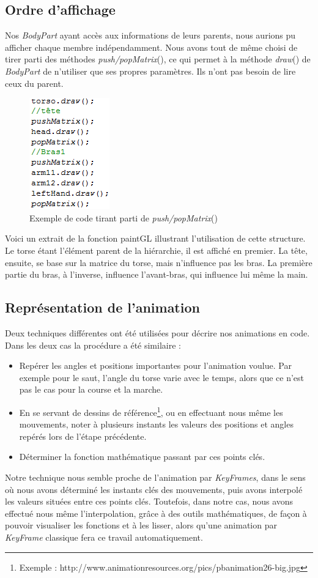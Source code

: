 \documentclass[10pt,a4paper,titlepage]{article}
\begin{document}
\subsection{Ordre d'affichage}
Nos \textit{BodyPart} ayant accès aux informations de leurs parents, nous aurions pu afficher chaque membre indépendamment. Nous avons tout de même choisi de tirer parti des méthodes \textit{push/popMatrix}(), ce qui permet à la méthode \textit{draw}() de \textit{BodyPart} de n'utiliser que ses propres paramètres. Ils n'ont pas besoin de lire ceux du parent.
\par
\begin{figure}[htbp]
\centering
\includegraphics{exemple_code_matrix.png}
\caption{Exemple de code tirant parti de \textit{push/popMatrix}()}
\end{figure}
Voici un extrait de la fonction paintGL illustrant l'utilisation de cette structure. Le torse étant l'élément parent de la hiérarchie, il est affiché en premier. La tête, ensuite, se base sur la matrice du torse, mais n'influence pas les bras. La première partie du bras, à l'inverse, influence l'avant-bras, qui influence lui même la main.

\subsection{Représentation de l'animation}
Deux techniques différentes ont été utilisées pour décrire nos animations en code. Dans les deux cas la procédure a été similaire : 
\begin{itemize}
	\item Repérer les angles et positions importantes pour l'animation voulue. Par exemple pour le saut, l'angle du torse varie avec le temps, alors que ce n'est pas le cas pour la course et la marche.
	\item En se servant de dessins de référence\footnote{Exemple : http://www.animationresources.org/pics/pbanimation26-big.jpg}, ou en effectuant nous même les mouvements, noter à plusieurs instants les valeurs des positions et angles repérés lors de l'étape précédente.
	\item Déterminer la fonction mathématique passant par ces points clés.
\end{itemize}
Notre technique nous semble proche de l'animation par \textit{KeyFrames}, dans le sens où nous avons déterminé les instants clés des mouvements, puis avons interpolé les valeurs situées entre ces points clés. Toutefois, dans notre cas, nous avons effectué nous même l'interpolation, grâce à des outils mathématiques, de façon à pouvoir visualiser les fonctions et à les lisser, alors qu'une animation par \textit{KeyFrame} classique fera ce travail automatiquement.
\end{document}
